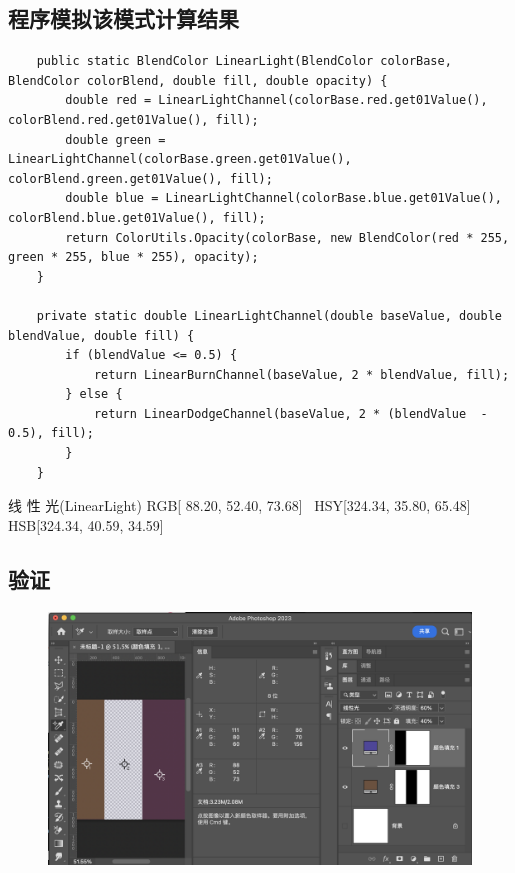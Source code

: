 \subsection{ 程序模拟该模式计算结果}

\begin{lstlisting}
	public static BlendColor LinearLight(BlendColor colorBase, BlendColor colorBlend, double fill, double opacity) {
		double red = LinearLightChannel(colorBase.red.get01Value(), colorBlend.red.get01Value(), fill);
		double green = LinearLightChannel(colorBase.green.get01Value(), colorBlend.green.get01Value(), fill);
		double blue = LinearLightChannel(colorBase.blue.get01Value(), colorBlend.blue.get01Value(), fill);
		return ColorUtils.Opacity(colorBase, new BlendColor(red * 255, green * 255, blue * 255), opacity);
	}
	
	private static double LinearLightChannel(double baseValue, double blendValue, double fill) {
		if (blendValue <= 0.5) {
			return LinearBurnChannel(baseValue, 2 * blendValue, fill);
		} else {
			return LinearDodgeChannel(baseValue, 2 * (blendValue  - 0.5), fill);
		}
	}
\end{lstlisting}

\begin{result}
\item 线 性 光(LinearLight)   RGB[ 88.20,  52.40,  73.68]~ HSY[324.34,  35.80,  65.48]~ HSB[324.34,  40.59,  34.59]
\end{result}

\subsection{ 验证}
\begin{figure}[h!]
	\centering
	\includegraphics[width=\linewidth]{figure/linearllght}
	\caption{}
	\label{fig:linearllght}
\end{figure}

